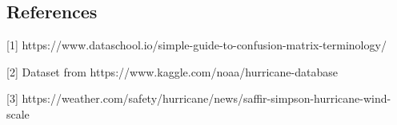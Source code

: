 \documentclass[11pt]{article}
\begin{document}
    \hypertarget{references}{%
\subsection{References}\label{references}}

    {[}1{]}
https://www.dataschool.io/simple-guide-to-confusion-matrix-terminology/

{[}2{]} Dataset from https://www.kaggle.com/noaa/hurricane-database

{[}3{]}
https://weather.com/safety/hurricane/news/saffir-simpson-hurricane-wind-scale


    
    
    
    
\end{document}

